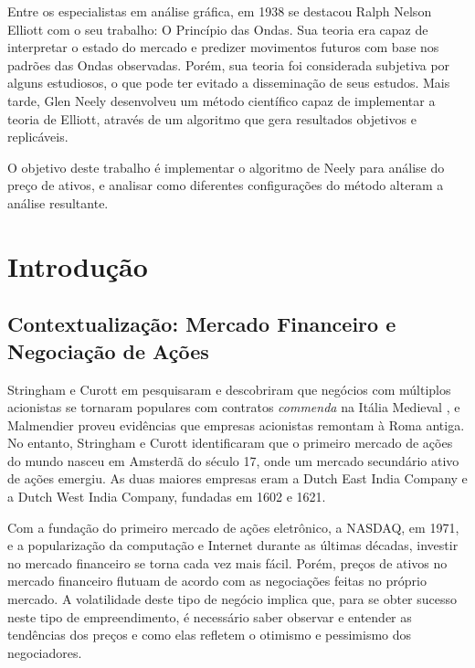 \documentclass[12pt]{article}
\begin{document}
Entre os especialistas em análise gráfica, em 1938 se destacou Ralph Nelson Elliott com
o seu trabalho: O Princípio das Ondas.
Sua teoria era capaz de interpretar o estado do mercado e predizer movimentos futuros com
base nos padrões das Ondas observadas. Porém, sua teoria foi considerada subjetiva por alguns
estudiosos, o que pode ter evitado a disseminação de seus estudos. Mais tarde, Glen Neely
desenvolveu um método científico capaz de implementar a teoria de Elliott, através de um
algoritmo que gera resultados objetivos e replicáveis.

O objetivo deste trabalho é implementar o algoritmo de Neely para análise do preço de ativos,
e analisar como diferentes configurações do método alteram a análise resultante.

\newpage


{}
\listoffigures

\newpage
{}
{}
\listoftables

\newpage

{}
\tableofcontents

\newpage


\section{Introdução}
\subsection{Contextualização: Mercado Financeiro e Negociação de Ações} \label{sec:Stockmarket}

Stringham e Curott em \cite{StringhamCurott:2015} pesquisaram e descobriram que 
negócios com múltiplos acionistas se tornaram populares com contratos \textit{commenda}
na Itália Medieval \cite{Greif:2006}, e Malmendier \cite{Malmendier:2009} proveu evidências
que empresas acionistas remontam à Roma antiga. No entanto, Stringham e Curott identificaram
que o primeiro mercado de ações do mundo nasceu em Amsterdã do século 17, onde um mercado
secundário ativo de ações emergiu. As duas maiores empresas eram a Dutch East India Company
e a Dutch West India Company, fundadas em 1602 e 1621. 

Com a fundação do primeiro mercado de ações eletrônico, a NASDAQ, em 1971, e a popularização
da computação e Internet durante as últimas décadas, investir no mercado financeiro se
torna cada vez mais fácil. Porém, preços de ativos no mercado financeiro flutuam de acordo
com as negociações feitas no próprio mercado. A volatilidade deste tipo de negócio implica
que, para se obter sucesso neste tipo de empreendimento, é necessário saber observar e entender
as tendências dos preços e como elas refletem o otimismo e pessimismo dos negociadores.
\end{document}
